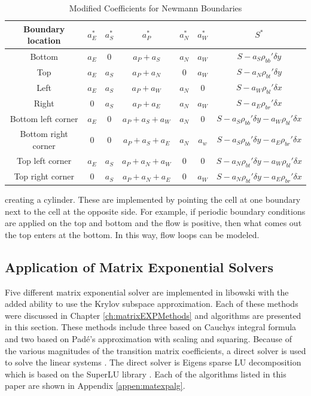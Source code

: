 \begin{table}[p]
    \caption{\label{tab:newmannBoundaries} Modified Coefficients for Newmann Boundaries}
    \centering
    \begin{tabular}{c|c|c|c|c|c|c}
    \hline
    \textbf{Boundary location} & \textbf{$a_{E}^{*}$} & \textbf{$a_{S}^{*}$} & \textbf{$a_{P}^{*}$} & \textbf{$a_{N}^{*}$} & \textbf{$a_{W}^{*}$} & \textbf{$S^{*}$} \\ [0.5ex]
    \hline
    \hline
    Bottom & $a_{E}$ & $0$ & $a_{P} + a_{S}$ & $a_{N}$ & $a_{W}$ & $S - a_{S}\rho_{bb}'\delta y$\\ \hline
    Top & $a_{E}$ & $a_{S}$ & $a_{P} + a_{N}$ & $0$ & $a_{W}$ & $S - a_{N}\rho_{bt}'\delta y$ \\ \hline 
    Left & $a_{E}$ & $a_{S}$ & $a_{P} + a_{W}$ & $a_{N}$ & $0$ & $S - a_{W}\rho_{bl}'\delta x$  \\ \hline
    Right & $0$ & $a_{S}$ & $a_{P} + a_{E}$ & $a_{N}$ & $a_{W}$ & $S - a_{E}\rho_{br}'\delta x$  \\ \hline
    Bottom left corner & $a_{E}$ & $0$ & $a_{P} + a_{S} + a_{W}$ & $a_{N}$ & $0$ & $S - a_{S}\rho_{bb}'\delta y - a_{W}\rho_{bl}'\delta x$ \\ \hline
    Bottom right corner & $0$ & $0$ & $a_{P} + a_{S} + a_{E}$ & $a_{N}$ & $a_{w}$ & $S - a_{S}\rho_{bb}'\delta y - a_{E}\rho_{br}'\delta x$ \\ \hline
    Top left corner & $a_{E}$ & $a_{S}$ & $a_{P} + a_{N} + a_{W}$ & $0$ & $0$ & $S - a_{N}\rho_{bt}'\delta y - a_{W}\rho_{bl}'\delta x$ \\ \hline
    Top right corner & $0$ & $a_{S}$ & $a_{P} + a_{N} + a_{E}$ & $0$ & $a_{W}$ & $S - a_{N}\rho_{bt}'\delta y - a_{E}\rho_{br}'\delta x$ \\ \hline
    \end{tabular}
\end{table}

\clearpage

\noindent creating a cylinder. These are implemented by pointing the cell at one boundary next to the cell at the opposite side. For example, if periodic boundary conditions are applied on the top and bottom and the flow is positive, then what comes out the top enters at the bottom. In this way, flow loops can be modeled.


\subsection{Application of Matrix Exponential Solvers}
Five different matrix exponential solver are implemented in libowski with the added ability to use the Krylov subspace approximation. Each of these methods were discussed in Chapter \ref{ch:matrixEXPMethods} and algorithms are presented in this section. These methods include three based on Cauchys integral formula and two based on Pad\'e's approximation with scaling and squaring. Because of the  various magnitudes of the transition matrix coefficients, a direct solver is used to solve the linear systems \cite{pusa2013}. The direct solver is Eigens sparse LU decomposition which is based on the SuperLU library \cite{eigen} \cite{superlu99}. Each of the algorithms listed in this paper are shown in Appendix \ref{appen:matexpalg}.

